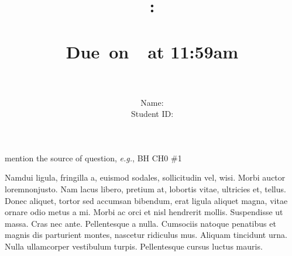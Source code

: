 \documentclass{article}
\title{
    \vspace{2in}
    \textmd{\textbf{\hmwkClass:\\  \hmwkTitle}}\\
    \normalsize\vspace{0.1in}\small{Due\ on\ \hmwkDueDate\ at 11:59am}\\
   \vspace{2in}\Huge{\hmwkClassID}\\   
   \vspace{2in}
}
\author{
	Name: \textbf{\hmwkAuthorName} \\
	Student ID: \hmwkAuthorID}
\date{}
\begin{document}
\maketitle
\pagebreak

\begin{homeworkProblem}{{\color{blue}mention the source of question}, \textit{e.g.}, BH CH0 \#1}

Namdui ligula, fringilla a, euismod sodales, sollicitudin vel, wisi. Morbi auctor loremnonjusto. Nam lacus libero, pretium at, lobortis vitae, ultricies et, tellus. Donec aliquet, tortor sed accumsan bibendum, erat ligula aliquet magna, vitae ornare odio metus a mi. Morbi ac orci et nisl hendrerit mollis. Suspendisse ut massa. Cras nec ante. Pellentesque a nulla. Cumsociis natoque penatibus et magnis dis parturient montes, nascetur ridiculus mus. Aliquam tincidunt urna. Nulla ullamcorper vestibulum turpis. Pellentesque cursus luctus mauris. 

\end{homeworkProblem}
\end{document}
